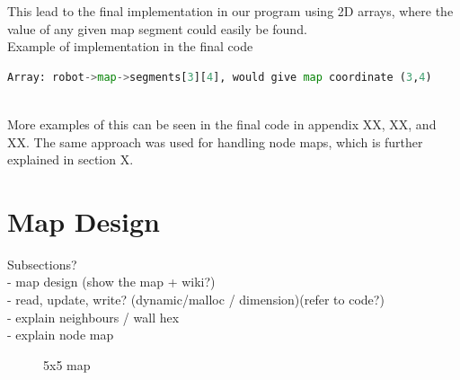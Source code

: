 This lead to the final implementation in our program using 2D arrays, 
where the value of any given map segment could easily be found. 
\\
Example of implementation in the final code
\begin{lstlisting}[language=Python]
Array: robot->map->segments[3][4], would give map coordinate (3,4)
\end{lstlisting}
\\
More examples of this can be seen in the final code in appendix XX, XX, and XX. 
The same approach was used for handling node maps, which is further explained in section X.

\section{Map Design}
\label{sec:map_design} %


Subsections?\\
- map design (show the map + wiki?)\\
- read, update, write? (dynamic/malloc / dimension)(refer to code?)\\
- explain neighbours / wall hex\\
- explain node map\\


\begin{figure}[htp]
    \centering
    \hspace{0.2\textwidth}
    \caption{5x5 map}
    \label{fig:5x5map}
\end{figure}

